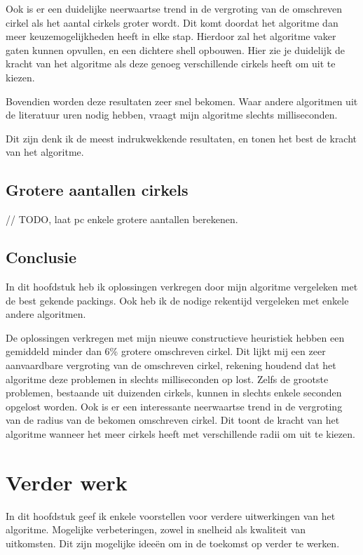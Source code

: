 \documentclass[12pt,a4paper,oneside]{book}
\begin{document}
Ook is er een duidelijke neerwaartse trend in de vergroting van de omschreven cirkel als het aantal cirkels groter wordt.
Dit komt doordat het algoritme dan meer keuzemogelijkheden heeft in elke stap.
Hierdoor zal het algoritme vaker gaten kunnen opvullen, en een dichtere shell opbouwen.
Hier zie je duidelijk de kracht van het algoritme als deze genoeg verschillende cirkels heeft om uit te kiezen.

Bovendien worden deze resultaten zeer snel bekomen.
Waar andere algoritmen uit de literatuur uren nodig hebben, vraagt mijn algoritme slechts milliseconden.

Dit zijn denk ik de meest indrukwekkende resultaten, en tonen het best de kracht van het algoritme.

\section{Grotere aantallen cirkels}

// TODO, laat pc enkele grotere aantallen berekenen.

\section{Conclusie}

In dit hoofdstuk heb ik oplossingen verkregen door mijn algoritme vergeleken met de best gekende packings.
Ook heb ik de nodige rekentijd vergeleken met enkele andere algoritmen.

De oplossingen verkregen met mijn nieuwe constructieve heuristiek hebben een gemiddeld minder dan 6\% grotere omschreven cirkel.
Dit lijkt mij een zeer aanvaardbare vergroting van de omschreven cirkel, rekening houdend dat het algoritme deze problemen in slechts milliseconden op lost.
Zelfs de grootste problemen, bestaande uit duizenden cirkels, kunnen in slechts enkele seconden opgelost worden.
Ook is er een interessante neerwaartse trend in de vergroting van de radius van de bekomen omschreven cirkel.
Dit toont de kracht van het algoritme wanneer het meer cirkels heeft met verschillende radii om uit te kiezen.

\chapter{Verder werk} \label{chap:verder-werk}

In dit hoofdstuk geef ik enkele voorstellen voor verdere uitwerkingen van het algoritme.
Mogelijke verbeteringen, zowel in snelheid als kwaliteit van uitkomsten.
Dit zijn mogelijke ideeën om in de toekomst op verder te werken.
\end{document}
